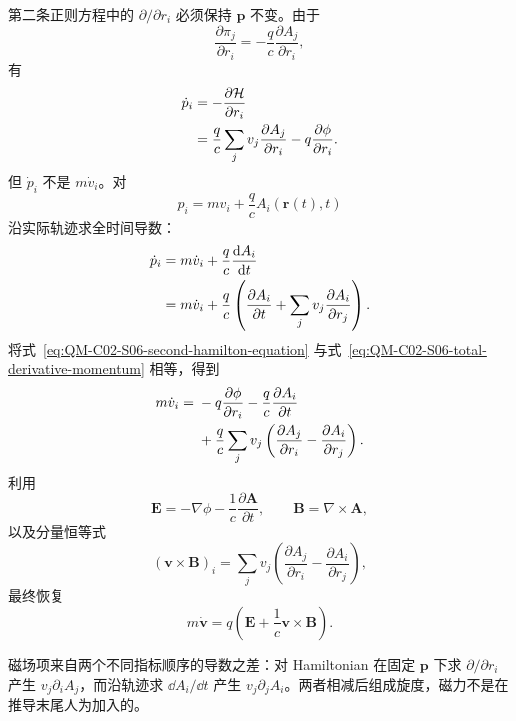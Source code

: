 第二条正则方程中的 $\partial/\partial r_i$ 必须保持 $\bm p$ 不变。由于
\[
  \frac{\partial\pi_j}{\partial r_i}
  =-\frac qc\frac{\partial A_j}{\partial r_i},
\]
有
\begin{align}
  \dot p_i
  &=-\frac{\partial\mathcal H}{\partial r_i} \notag\\
  &=\frac qc\sum_jv_j
    \frac{\partial A_j}{\partial r_i}
    -q\frac{\partial\phi}{\partial r_i}.
  \label{eq:QM-C02-S06-second-hamilton-equation}
\end{align}
但 $\dot p_i$ 不是 $m\dot v_i$。对
\[
  p_i=mv_i+\frac qcA_i(\bm r(t),t)
\]
沿实际轨迹求全时间导数：
\begin{align}
  \dot p_i
  &=m\dot v_i+\frac qc\frac{\mathop{}\!\mathrm{d} A_i}{\mathop{}\!\mathrm{d} t} \notag\\
  &=m\dot v_i+\frac qc
    \left(
      \frac{\partial A_i}{\partial t}
      +\sum_jv_j\frac{\partial A_i}{\partial r_j}
    \right).
  \label{eq:QM-C02-S06-total-derivative-momentum}
\end{align}
将式~\eqref{eq:QM-C02-S06-second-hamilton-equation} 与式~\eqref{eq:QM-C02-S06-total-derivative-momentum} 相等，得到
\begin{align}
  m\dot v_i
  ={}&
  -q\frac{\partial\phi}{\partial r_i}
  -\frac qc\frac{\partial A_i}{\partial t} \notag\\
  &+\frac qc\sum_jv_j
  \left(
    \frac{\partial A_j}{\partial r_i}
    -\frac{\partial A_i}{\partial r_j}
  \right).
  \label{eq:QM-C02-S06-lorentz-components}
\end{align}
利用
\begin{equation}
  \bm E=-\nabla\phi-\frac1c\frac{\partial\bm A}{\partial t},
  \qquad
  \bm B=\nabla\times\bm A,
  \label{eq:QM-C02-S06-fields-from-potentials}
\end{equation}
以及分量恒等式
\begin{equation}
  (\bm v\times\bm B)_i
  =\sum_jv_j
  \left(
    \frac{\partial A_j}{\partial r_i}
    -\frac{\partial A_i}{\partial r_j}
  \right),
  \label{eq:QM-C02-S06-magnetic-component-identity}
\end{equation}
最终恢复
\begin{equation}
  \boxed{
  m\dot{\bm v}
  =q\left(
    \bm E+\frac1c\bm v\times\bm B
  \right).}
  \label{eq:QM-C02-S06-lorentz-force}
\end{equation}

磁场项来自两个不同指标顺序的导数之差：对 Hamiltonian 在固定 $\bm p$ 下求 $\partial/\partial r_i$ 产生 $v_j\partial_iA_j$，而沿轨迹求 $\dd A_i/\dd t$ 产生 $v_j\partial_jA_i$。两者相减后组成旋度，磁力不是在推导末尾人为加入的。

